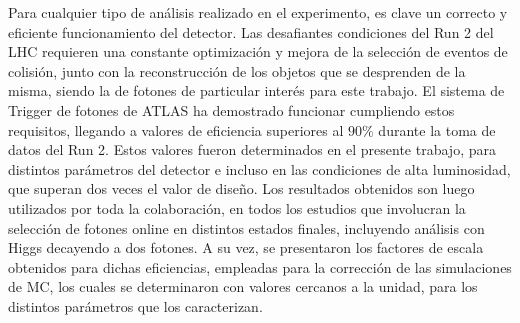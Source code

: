 Para cualquier tipo de análisis realizado en el experimento, es clave un correcto y eficiente funcionamiento del detector. Las desafiantes condiciones del Run 2 del LHC requieren una constante optimización y mejora de la selección de eventos de colisión, junto con la reconstrucción de los objetos que se desprenden de la misma, siendo la de fotones de particular interés para este trabajo.
El sistema de Trigger de fotones de ATLAS ha demostrado funcionar cumpliendo estos requisitos, llegando a valores de eficiencia superiores al $90\%$ durante la toma de datos del Run 2. Estos valores fueron determinados en el presente trabajo, para distintos parámetros del detector e incluso en las condiciones de alta luminosidad, que superan dos veces el valor de diseño. Los resultados obtenidos son luego utilizados por toda la colaboración, en todos los estudios que involucran la selección de fotones online en distintos estados finales, incluyendo análisis con Higgs decayendo a dos fotones. A su vez, se presentaron los factores de escala obtenidos para dichas eficiencias, empleadas para la corrección de las simulaciones de MC, los cuales se determinaron con valores cercanos a la unidad, para los distintos parámetros que los caracterizan.

